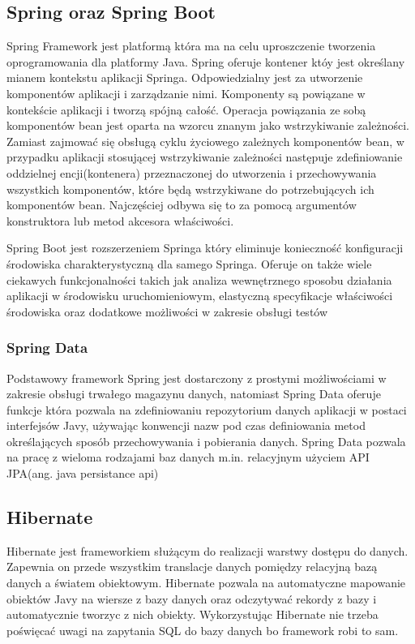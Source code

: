 \subsection{Spring oraz Spring Boot}
Spring Framework jest platformą która ma na celu uproszczenie tworzenia oprogramowania dla platformy Java. Spring oferuje kontener któy jest określany mianem kontekstu aplikacji Springa. Odpowiedzialny jest za utworzenie komponentów aplikacji i zarządzanie nimi. Komponenty są powiązane w kontekście aplikacji i tworzą spójną całość. Operacja powiązania ze sobą komponentów bean jest oparta na wzorcu znanym jako wstrzykiwanie zależności. Zamiast zajmować się obsługą cyklu życiowego zależnych komponentów bean, w przypadku aplikacji stosującej wstrzykiwanie zależności następuje zdefiniowanie oddzielnej encji(kontenera) przeznaczonej do utworzenia i przechowywania wszystkich komponentów, które będą wstrzykiwane do potrzebujących ich komponentów bean. Najczęściej odbywa się to za pomocą argumentów konstruktora lub metod akcesora właściwości. 

Spring Boot jest rozszerzeniem Springa który eliminuje konieczność konfiguracji środowiska charakterystyczną dla samego Springa. Oferuje on także wiele ciekawych funkcjonalności takich jak analiza wewnętrznego sposobu działania aplikacji w środowisku uruchomieniowym, elastyczną specyfikacje właściwości środowiska oraz dodatkowe możliwości w zakresie obsługi testów

\subsubsection{Spring Data}
Podstawowy framework Spring jest dostarczony z prostymi możliwościami w zakresie obsługi trwałego magazynu danych, natomiast Spring Data oferuje funkcje która pozwala na zdefiniowaniu repozytorium danych aplikacji w postaci interfejsów Javy, używając konwencji nazw pod czas definiowania metod określających sposób przechowywania i pobierania danych. Spring Data pozwala na pracę z wieloma rodzajami baz danych m.in. relacyjnym użyciem API JPA(ang. java persistance api)


\subsection{Hibernate}
Hibernate jest frameworkiem służącym do realizacji warstwy dostępu do danych. Zapewnia on przede wszystkim translacje danych pomiędzy relacyjną bazą danych a światem obiektowym. Hibernate pozwala na automatyczne mapowanie obiektów Javy na wiersze z bazy danych oraz odczytywać rekordy z bazy i automatycznie tworzyc z nich obiekty. Wykorzystując Hibernate nie trzeba poświęcać uwagi na zapytania SQL do bazy danych bo framework robi to sam.


